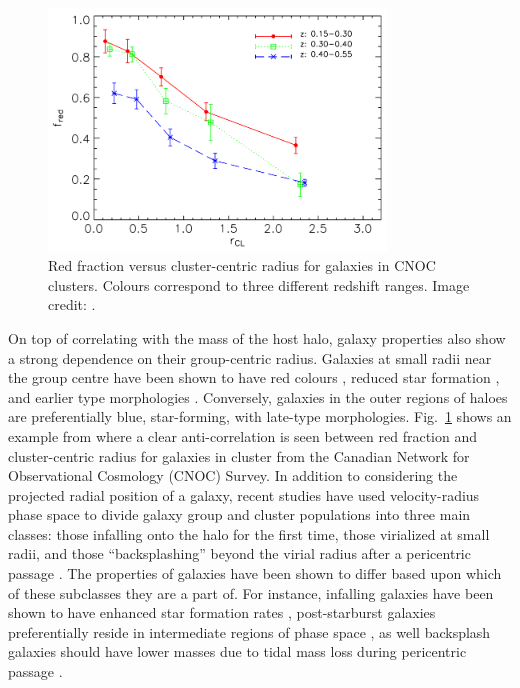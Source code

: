 \begin{figure}
  \centering
  \includegraphics[width=0.8\textwidth]{redFrac_r_li.png}
  \caption[Red fraction versus cluster-centric radius]{Red fraction
    versus cluster-centric radius for galaxies in 
    CNOC clusters.  Colours correspond to three different redshift
    ranges. Image credit: \citet{li2009}.}
  \label{fig:redFrac_r_li}
\end{figure}

On top of correlating with the mass of the host halo, galaxy
properties also show a strong dependence on their group-centric
radius.  Galaxies at small radii near the group centre have been shown
to have red colours \citep{blanton2007b, hansen2009, li2009,
  prescott2011}, reduced star formation
\citep{rasmussen2012, wetzel2012, haines2015}, and earlier type
morphologies
\citep{whitmore1993, goto2003, postman2005, fasano2015}.  Conversely, galaxies in the outer regions of
haloes are preferentially blue, star-forming, with late-type
morphologies.  Fig.~\ref{fig:redFrac_r_li} shows an example from
\citet{li2009} where a clear anti-correlation is seen between red
fraction and cluster-centric radius for galaxies in cluster from the
Canadian Network for Observational Cosmology (CNOC) Survey. In
addition to considering the projected radial
position of a galaxy, recent studies have used velocity-radius phase
space to divide galaxy group and cluster populations into three main
classes: those infalling onto the halo for the first time, those
virialized at small radii, and those ``backsplashing'' beyond the
virial radius after a pericentric passage
\citep[e.g.][]{mahajan2011}.  The
properties of galaxies have been shown to differ based upon which of
these subclasses they are a part of.  For instance, infalling galaxies
have been shown to have enhanced star formation rates \citep{noble2016}, post-starburst galaxies preferentially reside in
intermediate regions of phase space \citep{muzzin2014}, as well
backsplash galaxies should have lower masses due to tidal mass loss
during pericentric passage \citep{gill2005}. \newline

